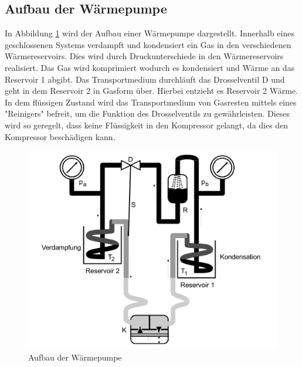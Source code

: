 \subsection{Aufbau der Wärmepumpe}
\label{sec:AdW}
In Abbildung \ref{fig:aufbau} wird der Aufbau einer Wärmepumpe dargestellt.
Innerhalb eines geschlossenen Systems verdampft und kondensiert ein Gas in den verschiedenen Wärmereservoirs.
Dies wird durch Druckunterschiede in den Wärmereservoirs realisiert.
Das Gas wird komprimiert wodurch es kondensiert und Wärme an das Reservoir 1 abgibt.
Das Transportmedium durchläuft das Drosselventil D und geht in dem Reservoir 2 in Gasform über.
Hierbei entzieht es Reservoir 2 Wärme.
In dem flüssigen Zustand wird das Transportmedium von Gasresten mittels eines "Reinigers" befreit, um die Funktion des 
Drosselventils zu gewährleisten.
Dieses wird so geregelt, dass keine Flüssigkeit in den Kompressor gelangt, da dies den Kompressor beschädigen kann.
\begin{figure}[H]
    \centering
    \includegraphics[width=\textwidth]{content/aufbau.png}
    \caption{Aufbau der Wärmepumpe\cite{v206}}
    \label{fig:aufbau}
\end{figure}
